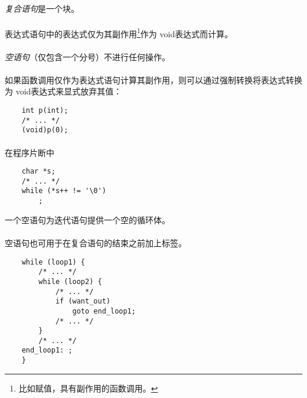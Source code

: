 {\semantic
\paragraph{}
\textit{复合语句}是一个块。

\syntax
\paragraph{}

\semantic
\paragraph{}
表达式语句中的表达式仅为其副作用\footnote{比如赋值，具有副作用的函数调用。}作为
void表达式而计算。

\paragraph{}
\textit{空语句}（仅包含一个分号）不进行任何操作。

\paragraph{}
\ex 如果函数调用仅作为表达式语句计算其副作用，则可以通过强制转换将表达式转换为
void表达式来显式放弃其值：
\begin{lstlisting}
    int p(int);
    /* ... */
    (void)p(0);
\end{lstlisting}

\paragraph{}
\ex 在程序片断中
\begin{lstlisting}
    char *s;
    /* ... */
    while (*s++ != '\0')
        ;
\end{lstlisting}
一个空语句为迭代语句提供一个空的循环体。

\paragraph{}
\ex 空语句也可用于在复合语句的结束\tm{\}}之前加上标签。
\begin{lstlisting}
    while (loop1) {
        /* ... */
        while (loop2) {
            /* ... */
            if (want_out)
                goto end_loop1;
            /* ... */
        }
        /* ... */
    end_loop1: ;
    }
\end{lstlisting}

}
